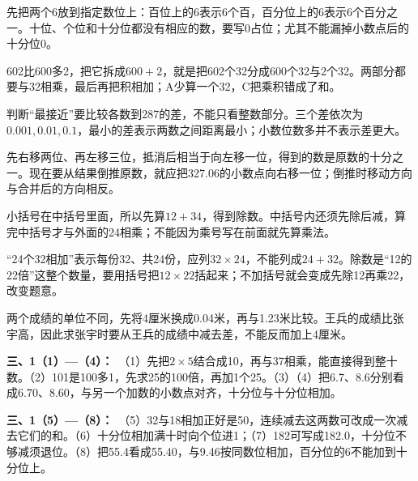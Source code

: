 \documentclass[multi=snippet,border=0pt]{standalone}
\newenvironment{snippet}[3]{\begin{minipage}{#1bp}\color{answerred}\fontsize{#2}{#3}\selectfont\raggedright}{\end{minipage}}
\begin{document}
\begin{snippet}{505}{11.5}{14}先把两个6放到指定数位上：百位上的6表示6个百，百分位上的6表示6个百分之一。十位、个位和十分位都没有相应的数，要写0占位；尤其不能漏掉小数点后的十分位0。\end{snippet}
\begin{snippet}{505}{11.5}{14}602比600多2，把它拆成\(600+2\)，就是把602个32分成600个32与2个32。两部分都要与32相乘，最后再把积相加；A少算一个32，C把乘积错成了和。\end{snippet}
\begin{snippet}{505}{11.5}{14}判断“最接近”要比较各数到287的差，不能只看整数部分。三个差依次为\(0.001,0.01,0.1\)，最小的差表示两数之间距离最小；小数位数多并不表示差更大。\end{snippet}
\begin{snippet}{505}{11.5}{14}先右移两位、再左移三位，抵消后相当于向左移一位，得到的数是原数的十分之一。现在要从结果倒推原数，就应把327.06的小数点向右移一位；倒推时移动方向与合并后的方向相反。\end{snippet}
\begin{snippet}{505}{11.5}{14}小括号在中括号里面，所以先算\(12+34\)，得到除数。中括号内还须先除后减，算完中括号才与外面的24相乘；不能因为乘号写在前面就先算乘法。\end{snippet}
\begin{snippet}{505}{11.5}{14}“24个32相加”表示每份32、共24份，应列\(32\times24\)，不能列成\(24+32\)。除数是“12的22倍”这整个数量，要用括号把\(12\times22\)括起来；不加括号就会变成先除12再乘22，改变题意。\end{snippet}
\begin{snippet}{505}{11.5}{14}两个成绩的单位不同，先将4厘米换成0.04米，再与1.23米比较。王兵的成绩比张宇高，因此求张宇时要从王兵的成绩中减去差，不能反而加上4厘米。\end{snippet}
\begin{snippet}{505}{11.5}{14}\textbf{三、1（1）—（4）：}\ （1）先把\(2\times5\)结合成10，再与37相乘，能直接得到整十数。（2）101是100多1，先求25的100倍，再加1个25。（3）（4）把6.7、8.6分别看成6.70、8.60，与另一个加数的小数点对齐，十分位与十分位相加。\end{snippet}
\begin{snippet}{505}{11.5}{14}\textbf{三、1（5）—（8）：}\ （5）32与18相加正好是50，连续减去这两数可改成一次减去它们的和。（6）十分位相加满十时向个位进1；（7）182可写成182.0，十分位不够减须退位。（8）把55.4看成55.40，与9.46按同数位相加，百分位的6不能加到十分位上。\end{snippet}
\end{document}
